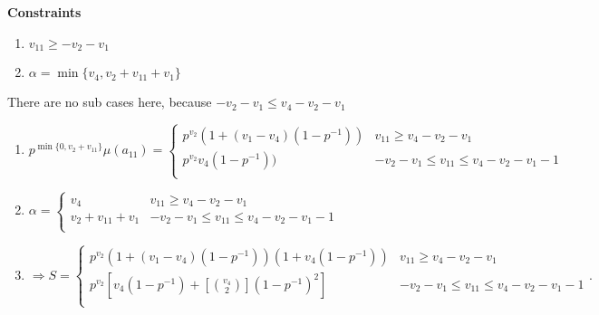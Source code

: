 \documentclass{article}
\begin{document}
\begin{enumerate}
    \textbf{Constraints}
    \begin{enumerate}
        \item $v_{11}\geq{-v_2-v_1}$
        \item $\alpha=\min\{v_4,v_2+v_{11}+v_1\}$
    \end{enumerate}
There are no sub cases here, because $-v_2-v_1\leq{v_4-v_2-v_1}$
        \begin{enumerate}
            \item $p^{\min\{0,v_2+v_{11}\}}\mu(a_{11})=
            \left\{
	\begin{array}{ll}
            p^{v_2}(1+(v_1-v_4)(1-p^{-1})) & v_{11}\geq{v_4-v_2-v_1} \\
		  p^{v_2}v_4(1-p^{-1})) & -v_2-v_1\leq{v_{11}}\leq{v_4-v_2-v_1-1} \\
	\end{array}
\right.
$
            \item $\alpha=\left\{
	\begin{array}{ll}
            v_4  & v_{11}\geq{v_4-v_2-v_1} \\
		  v_2+v_{11}+v_1 & -v_2-v_1\leq{v_{11}}\leq{v_4-v_2-v_1-1} \\
	\end{array}
\right.$
        \item $\Rightarrow{S=\left\{
	\begin{array}{ll}
            p^{v_2}(1+(v_1-v_4)(1-p^{-1}))(1+v_4(1-p^{-1}))  & v_{11}\geq{v_4-v_2-v_1} \\
		              p^{v_2}[v_4(1-p^{-1})+[\binom{v_4}{2}](1-p^{-1})^2]  & -v_2-v_1\leq{v_{11}}\leq{v_4-v_2-v_1-1} \\
	\end{array}
\right.}.$
        \end{enumerate}
    \end{enumerate}
\end{document}
